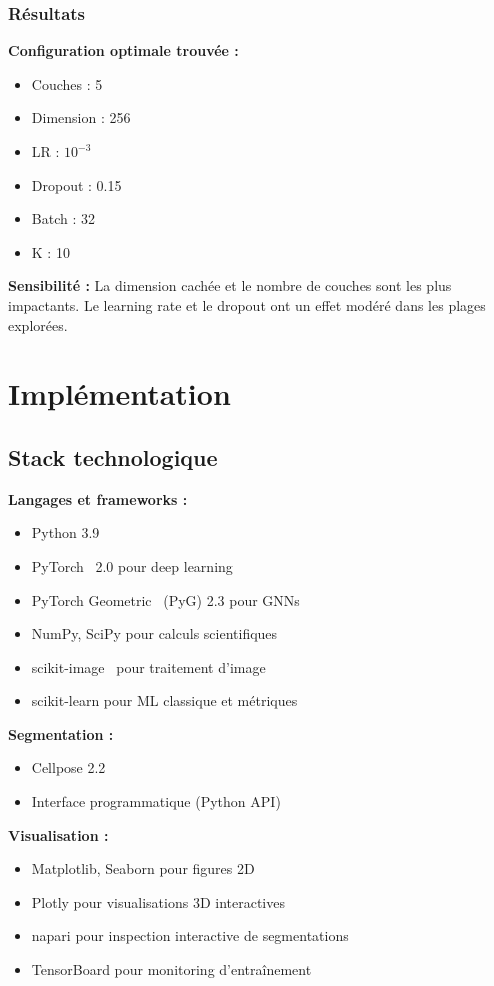 \subsubsection{Résultats}

\textbf{Configuration optimale trouvée :}
\begin{itemize}
    \item Couches : 5
    \item Dimension : 256
    \item LR : $10^{-3}$
    \item Dropout : 0.15
    \item Batch : 32
    \item K : 10
\end{itemize}

\textbf{Sensibilité :}
La dimension cachée et le nombre de couches sont les plus impactants. Le learning rate et le dropout ont un effet modéré dans les plages explorées.

\section{Implémentation}

\subsection{Stack technologique}

\textbf{Langages et frameworks :}
\begin{itemize}
    \item Python 3.9
    \item PyTorch~\cite{Paszke2019} 2.0 pour deep learning
    \item PyTorch Geometric~\cite{Fey2019} (PyG) 2.3 pour GNNs
    \item NumPy, SciPy pour calculs scientifiques
    \item scikit-image~\cite{VanDerWalt2014} pour traitement d'image
    \item scikit-learn pour ML classique et métriques
\end{itemize}

\textbf{Segmentation :}
\begin{itemize}
    \item Cellpose 2.2
    \item Interface programmatique (Python API)
\end{itemize}

\textbf{Visualisation :}
\begin{itemize}
    \item Matplotlib, Seaborn pour figures 2D
    \item Plotly pour visualisations 3D interactives
    \item napari pour inspection interactive de segmentations
    \item TensorBoard pour monitoring d'entraînement
\end{itemize}

